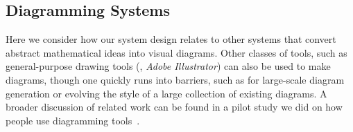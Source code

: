 





\subsection{Diagramming Systems}
\label{sec:RelatedSystems}

Here we consider how our system design relates to other systems that convert abstract mathematical ideas into visual diagrams.  Other classes of tools, such as general-purpose drawing tools (\eg{}, \emph{Adobe Illustrator}) can also be used to make diagrams, though one quickly runs into barriers, such as for large-scale diagram generation or evolving the style of a large collection of existing diagrams.  A broader discussion of related work can be found in a pilot study we did on how people use diagramming tools~\cite{Ni:2020:HDE}.

